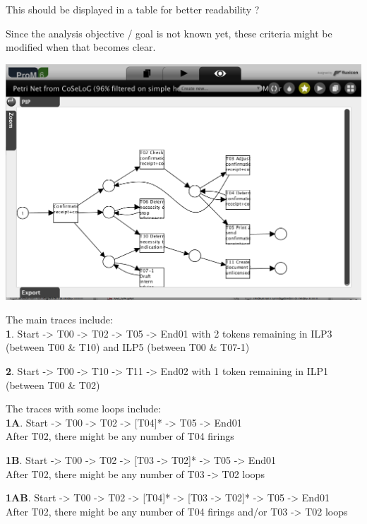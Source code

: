 \documentclass[]{article}
\begin{document}
This should be displayed in a table for better readability ?

Since the analysis objective / goal is not known yet, these criteria
might be modified when that becomes clear.

\includegraphics{CoSeLoG_Step_05_Filter96_PetriNet_ILP.png}

The main traces include:\\\textbf{1}. Start -\textgreater{} T00
-\textgreater{} T02 -\textgreater{} T05 -\textgreater{} End01 with 2
tokens remaining in ILP3 (between T00 \& T10) and ILP5 (between T00 \&
T07-1)

\textbf{2}. Start -\textgreater{} T00 -\textgreater{} T10
-\textgreater{} T11 -\textgreater{} End02 with 1 token remaining in ILP1
(between T00 \& T02)

The traces with some loops include:\\\textbf{1A}. Start -\textgreater{}
T00 -\textgreater{} T02 -\textgreater{} {[}T04{]}* -\textgreater{} T05
-\textgreater{} End01\\ After T02, there might be any number of T04
firings

\textbf{1B}. Start -\textgreater{} T00 -\textgreater{} T02
-\textgreater{} {[}T03 -\textgreater{} T02{]}* -\textgreater{} T05
-\textgreater{} End01\\ After T02, there might be any number of T03
-\textgreater{} T02 loops

\textbf{1AB}. Start -\textgreater{} T00 -\textgreater{} T02
-\textgreater{} {[}T04{]}* -\textgreater{} {[}T03 -\textgreater{}
T02{]}* -\textgreater{} T05 -\textgreater{} End01\\ After T02, there
might be any number of T04 firings and/or T03 -\textgreater{} T02 loops
\end{document}
